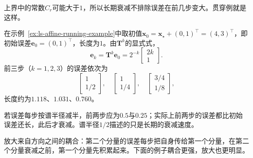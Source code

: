 上界中的常数$C_r$可能大于$1$，所以长期衰减不排除误差在前几步变大。贯穿例就是这样。
\begin{example}[贯穿例的暂时放大]
\label{ex:ls-running-transient}
在示例~\ref{ex:ls-affine-running-example}中取初值$\bm x_0=\bm x_\star+(0,1)^\top=(4,3)^\top$，即初始误差$\bm e_0=(0,1)^\top$，长度为$1$。由$\bm T^k$的显式式，
\[
 \bm e_k=\bm T^k\bm e_0=2^{-k}\begin{bmatrix}2k\\1\end{bmatrix}.
\]
前三步（$k=1,2,3$）的误差依次为
\[
 \begin{bmatrix}1\\1/2\end{bmatrix},\quad
 \begin{bmatrix}1\\1/4\end{bmatrix},\quad
 \begin{bmatrix}3/4\\1/8\end{bmatrix},
\]
长度约为$1.118$、$1.031$、$0.760$。

若误差每步按谱半径减半，前两步应为$0.5$与$0.25$；实际上前两步的误差都比初始误差还长，此后才衰减。谱半径$1/2$描述的只是长期的衰减速度。
\end{example}
放大来自方向之间的耦合：第二个分量的误差每步把自身传给第一个分量，在第二个分量衰减之前，第一个分量先积累起来。下面的例子耦合更强，放大也更明显。
